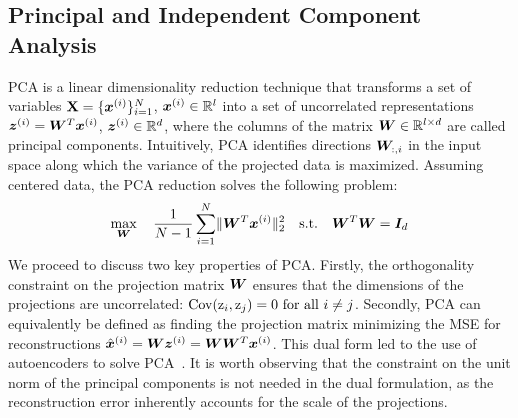 \subsection{Principal and Independent Component Analysis} \label{subsec:pca_application}

PCA is a linear dimensionality reduction technique that transforms a set of variables ${\mathbf{X}} = \{{\bm{x}}^{(i)}\}_{i=1}^N$, ${\bm{x}}^{(i)} \in \mathbb{R}^l$ into a set of uncorrelated representations ${\bm{z}}^{(i)} = {\bm{W}}^T{\bm{x}}^{(i)}$, ${\bm{z}}^{(i)} \in \mathbb{R}^d$, where the columns of the matrix ${\bm{W}} \in \mathbb{R}^{l \times d}$ are called principal components. 
Intuitively, PCA identifies directions ${\bm{W}}_{:,i}$ in the input space along which the variance of the projected data is maximized. Assuming centered data, the PCA reduction solves the following problem:
\begin{equation} \label{eq:pca_max_var_def}
    \max_{{\bm{W}}} \quad \frac{1}{N-1} \sum_{i=1}^N \lVert {\bm{W}}^T{\bm{x}}^{(i)} \rVert_2^2 \quad
    \textrm{s.t.} \quad {\bm{W}}^T{\bm{W}} = {\bm{I}}_d 
\end{equation}
We proceed to discuss two key properties of PCA. 
Firstly, the orthogonality constraint on the projection matrix ${\bm{W}}$ ensures that the dimensions of the projections are uncorrelated: $\mathrm{Cov}({\textnormal{z}}_i, {\textnormal{z}}_j) = 0 \text{ for all } i \neq j$. 
Secondly, PCA can equivalently be defined as finding the projection matrix minimizing the MSE for reconstructions $\hat{{\bm{x}}}^{(i)} = {\bm{W}}{\bm{z}}^{(i)} = {\bm{W}}{\bm{W}}^T{\bm{x}}^{(i)}$. This dual form led to the use of autoencoders to solve PCA~\citep{baldi1989pca_and_sgd,kramer1991autoencoder_nlpca,hinton2006pca_ae_sgd}. 
It is worth observing that the constraint on the unit norm of the principal components is not needed in the dual formulation, as the reconstruction error inherently accounts for the scale of the projections. 

